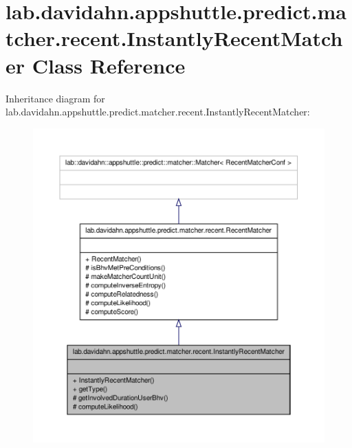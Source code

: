 \hypertarget{classlab_1_1davidahn_1_1appshuttle_1_1predict_1_1matcher_1_1recent_1_1_instantly_recent_matcher}{\section{lab.\-davidahn.\-appshuttle.\-predict.\-matcher.\-recent.\-Instantly\-Recent\-Matcher \-Class \-Reference}
\label{classlab_1_1davidahn_1_1appshuttle_1_1predict_1_1matcher_1_1recent_1_1_instantly_recent_matcher}
}


\-Inheritance diagram for lab.\-davidahn.\-appshuttle.\-predict.\-matcher.\-recent.\-Instantly\-Recent\-Matcher\-:
\nopagebreak
\begin{figure}[H]
\begin{center}
\leavevmode
\includegraphics[width=350pt]{classlab_1_1davidahn_1_1appshuttle_1_1predict_1_1matcher_1_1recent_1_1_instantly_recent_matcher__inherit__graph}
\end{center}
\end{figure}


